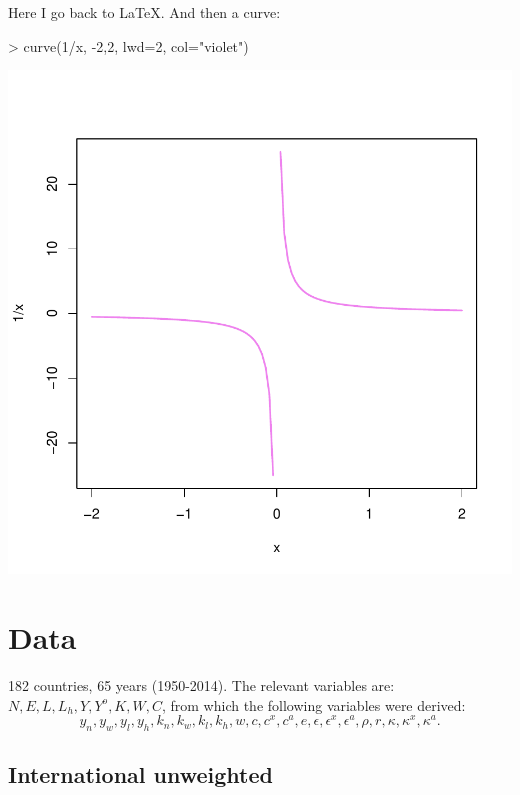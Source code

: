 \documentclass[pt=12]{article}
\begin{document}
Here I go back to \LaTeX.  And then a curve:

\begin{Schunk}
\begin{Sinput}
> curve(1/x, -2,2, lwd=2, col="violet")
\end{Sinput}
\end{Schunk}
\includegraphics{dhgc-002}

\section{Data}

182 countries, 65 years (1950-2014).  The relevant variables are: $N, E, L, L_h, Y, Y^o, K, W, C$, from which the following variables were derived: 
\[
y_n, y_w, y_l, y_h, k_n, k_w, k_l, k_h, w, c, c^x, c^a, e, \epsilon, \epsilon^x, \epsilon^a, \rho, r, \kappa, \kappa^x, \kappa^a.
\]

\subsection{International unweighted}
\end{document}
